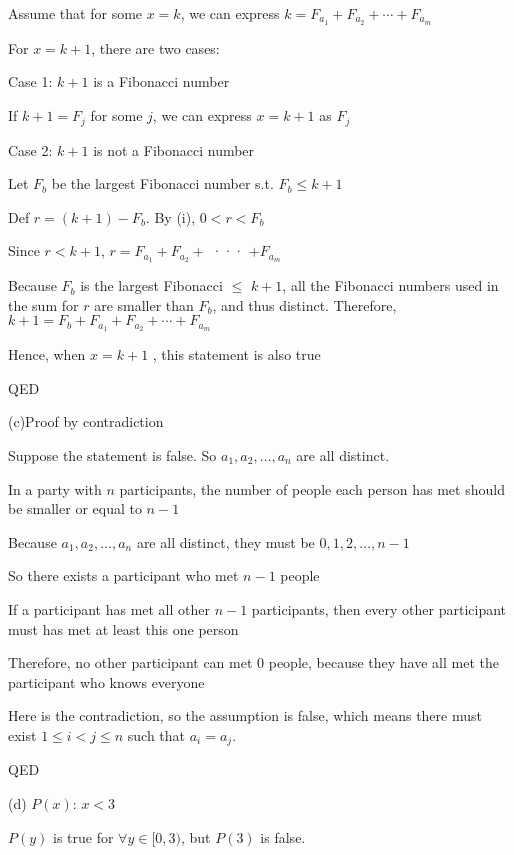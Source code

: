 \documentclass[11pt,twoside]{article}
\newenvironment{solution}{{\par\noindent\it Solution.}}{}
\begin{document}
\begin{solution}

    
    Assume that for some $x = k$, we can express $k = F_{a_1} + F_{a_2} + \cdots + F_{a_m}$

    For $x = k + 1$, there are two cases:

    Case 1: $k+1$ is a Fibonacci number

    If $k + 1 = F_j$ for some \( j \), we can express $x = k + 1$ as $F_j$

    Case 2: $k + 1$ is not a Fibonacci number

    Let \( F_b \) be the largest Fibonacci number s.t. $F_b \leq k + 1$
    
    Def $r = (k + 1) - F_b$. By (i),  $0<r < F_b$

    Since $r < k + 1$, $r = F_{a_1} + F_{a_2} +$ ··· $+ F_{a_m}$

    Because \( F_b \) is the largest Fibonacci $\leq$  $k + 1$, all the Fibonacci numbers used in the sum for $r$ are smaller than \( F_b \), and thus distinct. Therefore, $k + 1 = F_b + F_{a_1} + F_{a_2} + \cdots + F_{a_m}$

    Hence, when $x = k + 1$ , this statement is also true

    QED

    \hspace*{\fill}

    (c)Proof by contradiction

    Suppose the statement is false. So \(a_1, a_2, \ldots, a_n\) are all distinct.

    In a party with $n$ participants, the number of people each person has met should be smaller or equal to $n-1$


    Because \(a_1, a_2, \ldots, a_n\) are all distinct, they must be $0, 1, 2, \ldots, n-1$
    
    So there exists a participant who met $n-1$ people

    If a participant has met all other $n-1$ participants, then every other participant must has met at least this one person
    
    Therefore, no other participant can met 0 people, because they have all met the participant who knows everyone

    Here is the contradiction, so the assumption is false, which means there must exist \(1 \leq i < j \leq n\) such that \(a_i = a_j\).

    QED


    \hspace*{\fill}

    (d)
    $P(x)$: $ x < 3 $


    $P(y)$ is true for $\forall y \in [0, 3)$, but $P(3)$ is false.


\end{solution}
\end{document}

